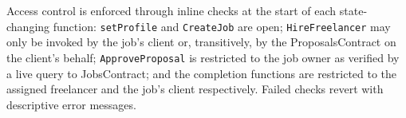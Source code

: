 Access control is enforced through inline checks at the start of each state-changing function: \texttt{setProfile} and \texttt{CreateJob} are open; \texttt{HireFreelancer} may only be invoked by the job's client or, transitively, by the ProposalsContract on the client's behalf; \texttt{ApproveProposal} is restricted to the job owner as verified by a live query to JobsContract; and the completion functions are restricted to the assigned freelancer and the job's client respectively. Failed checks revert with descriptive error messages.
